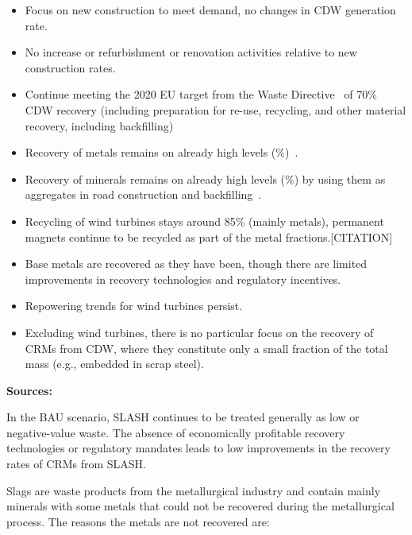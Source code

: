 \begin{itemize}
  \item Focus on new construction to meet demand, no changes in CDW generation rate.
  \item No increase or refurbishment or renovation activities relative to new construction rates.
  \item Continue meeting the 2020 EU target from the Waste Directive~\cite{eu2008wastedirective} of 70\% CDW recovery (including preparation for re-use, recycling, and other material recovery, including backfilling)
  \item Recovery of metals remains on already high levels (\%)~\cite{moschen2023cdw}.
  \item Recovery of minerals remains on already high levels (\%) by using them as aggregates in road construction and backfilling~\cite{moschen2023cdw}.
  \item Recycling of wind turbines stays around 85\% (mainly metals), permanent magnets continue to be recycled as part of the metal fractions.[CITATION]
  \item Base metals are recovered as they have been, though there are limited improvements in recovery technologies and regulatory incentives.
  \item Repowering trends for wind turbines persist.
  \item Excluding wind turbines, there is no particular focus on the recovery of CRMs from CDW, where they constitute only a small fraction of the total mass (e.g., embedded in scrap steel).
\end{itemize}



\wasteSubsubsecSLASH 
\textbf{Sources:}~\cite{eurofer2023steel,euroal2023aluminium,vogl2020steelgreen,visualcapitalist2023steel,asquer2019ash}

In the BAU scenario, SLASH continues to be treated generally as low or negative-value waste. The absence of economically profitable recovery technologies or regulatory mandates leads to low improvements in the recovery rates of CRMs from SLASH.


Slags are waste products from the metallurgical industry and contain mainly minerals with some metals that could not be recovered during the metallurgical process. The reasons the metals are not recovered are:

